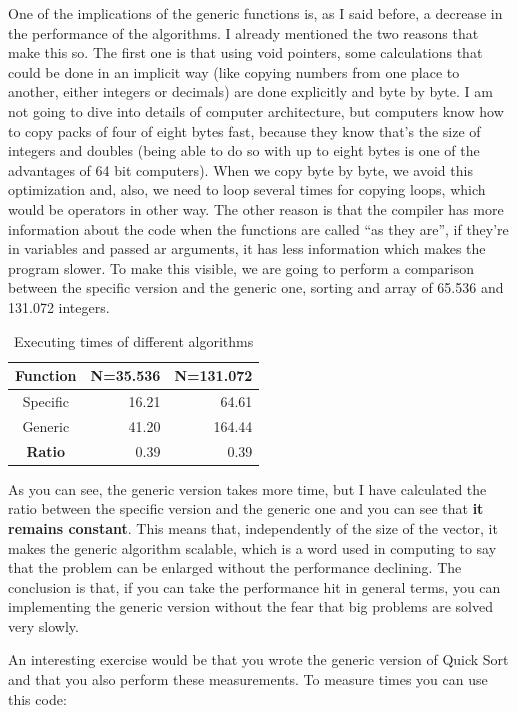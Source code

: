 \documentclass[a4paper]{article}
\begin{document}
One of the implications of the generic functions is, as I said before, a
decrease in the performance of the algorithms. I already mentioned the two
reasons that make this so. The first one is that using void pointers, some
calculations that could be done in an implicit way (like copying numbers from
one place to another, either integers or decimals) are done explicitly and byte
by byte. I am not going to dive into details of computer architecture, but
computers know how to copy packs of four of eight bytes fast, because they know
that's the size of integers and doubles (being able to do so with up to eight
bytes is one of the advantages of 64 bit computers). When we copy byte by byte,
we avoid this optimization and, also, we need to loop several times for copying
loops, which would be operators in other way. The other reason is that the
compiler has more information about the code when the functions are called
``as they are'', if they're in variables and passed ar arguments, it has less
information which makes the program slower. To make this visible, we are going
to perform a comparison between the specific version and the generic one,
sorting and array of 65.536 and 131.072 integers.

\begin{table}[H]
\begin{tabularx}{\linewidth}{|c|R|R|}
\hline
\textbf{Function}&\textbf{N=35.536}&\textbf{N=131.072}\\\hline
Specific&16.21&64.61\\\hline
Generic&41.20&164.44\\\hline
\textbf{Ratio}&0.39&0.39\\\hline
\end{tabularx}
\caption{Executing times of different algorithms}
\label{tab:sortingTimes}
\end{table}

As you can see, the generic version takes more time, but I have calculated the
ratio between the specific version and the generic one and you can see that
\textbf{it remains constant}. This means that, independently of the size of
the vector, it makes the generic algorithm scalable, which is a word used in
computing to say that the problem can be enlarged without the performance
declining. The conclusion is that, if you can take the performance hit in
general terms, you can implementing the generic version without the fear that
big problems are solved very slowly.

An interesting exercise would be that you wrote the generic version of Quick
Sort and that you also perform these measurements. To measure times you can use
this code:
\end{document}
